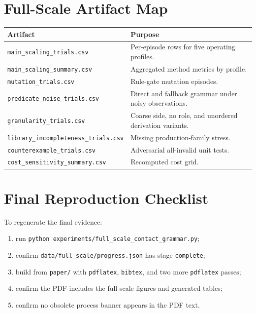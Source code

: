 \documentclass{article}
\begin{document}
\section{Full-Scale Artifact Map}

\begin{center}
\small
\begin{tabular}{ll}
\toprule
Artifact & Purpose \\
\midrule
\texttt{main\_scaling\_trials.csv} & Per-episode rows for five operating profiles. \\
\texttt{main\_scaling\_summary.csv} & Aggregated method metrics by profile. \\
\texttt{mutation\_trials.csv} & Rule-gate mutation episodes. \\
\texttt{predicate\_noise\_trials.csv} & Direct and fallback grammar under noisy observations. \\
\texttt{granularity\_trials.csv} & Coarse side, no role, and unordered derivation variants. \\
\texttt{library\_incompleteness\_trials.csv} & Missing production-family stress. \\
\texttt{counterexample\_trials.csv} & Adversarial all-invalid unit tests. \\
\texttt{cost\_sensitivity\_summary.csv} & Recomputed cost grid. \\
\bottomrule
\end{tabular}
\end{center}

\section{Final Reproduction Checklist}

To regenerate the final evidence:
\begin{enumerate}
    \item run \texttt{python experiments/full\_scale\_contact\_grammar.py};
    \item confirm \texttt{data/full\_scale/progress.json} has stage \texttt{complete};
    \item build from \texttt{paper/} with \texttt{pdflatex}, \texttt{bibtex}, and two more \texttt{pdflatex} passes;
    \item confirm the PDF includes the full-scale figures and generated tables;
    \item confirm no obsolete process banner appears in the PDF text.
\end{enumerate}
\end{document}
